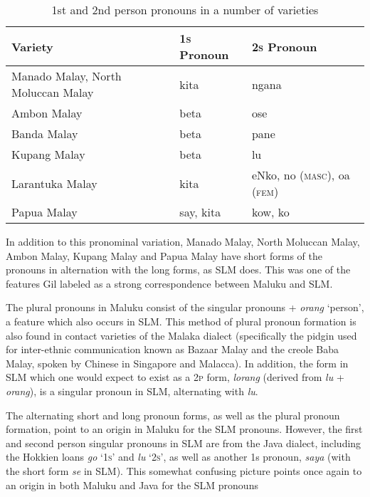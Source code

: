 \begin{table}

\begin{tabular}{lll}
\textbf{Variety} &
\textbf{1}\textbf{\textsc{s}}\textbf{ Pronoun} &
\textbf{2}\textbf{\textsc{s}}\textbf{ Pronoun}\footnotemark{}\\\hline
Manado Malay, North Moluccan Malay &
kita &
ngana\\
Ambon Malay &
beta &
ose\\
Banda Malay &
beta &
pane\\
Kupang Malay &
beta &
lu\\
Larantuka Malay &
kita &
eNko, no (\textsc{masc}), oa (\textsc{fem})\\
Papua Malay &
say, kita &
kow, ko\\
\end{tabular}
\caption{1st and 2nd person pronouns in a number of varieties}
\label{paauw:tab:pronouns}
\end{table}

In addition to this pronominal variation, Manado Malay, North Moluccan Malay, Ambon Malay, Kupang Malay and Papua Malay have short forms of the pronouns in alternation with the long forms, as SLM does. This was one of the features Gil labeled as a strong correspondence between Maluku and SLM.

The plural pronouns in Maluku consist of the singular pronouns + \textit{orang} `person', a feature which also occurs in SLM. This method of plural pronoun formation is also found in contact varieties of the Malaka dialect (specifically the pidgin used for inter-ethnic communication known as Bazaar Malay and the creole Baba Malay, spoken by Chinese in Singapore and Malacca). In addition, the form in SLM which one would expect to exist as a 2\textsc{p }form, \textit{lorang} (derived from \textit{lu} + \textit{orang}), is a singular pronoun in SLM, alternating with \textit{lu}.

The alternating short and long pronoun forms, as well as the plural pronoun formation, point to an origin in Maluku for the SLM pronouns. However, the first and second person singular pronouns in SLM are from the Java dialect, including the Hokkien loans \textit{go} `1\textsc{s}' and \textit{lu} `2\textsc{s}', as well as another 1s pronoun, \textit{saya} (with the short form \textit{se} in SLM). This somewhat confusing picture points once again to an origin in both Maluku and Java for the SLM pronouns

